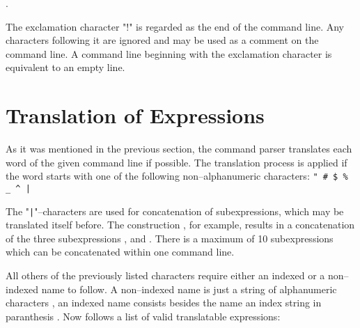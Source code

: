 .

\noindent
The exclamation character "!" is regarded as the end of the
command line.  Any characters following it are ignored and may be
used as a comment on the command line.  A command line beginning
with the exclamation character is equivalent to an empty line.



\section{Translation of Expressions}
\label{sec:Translation}

As it was mentioned in the previous section, the command parser
translates each word of the given command line if possible.
The translation process is applied if the word starts with one
of the following non--alphanumeric characters:
\verb+" # $ % _ ^ |+

The "\verb+|+"--characters are used for concatenation of
subexpressions, which may be translated itself before. The
construction , for example, results in a
concatenation of the three subexpressions ,
 and .  There is a maximum of 10
subexpressions which can be concatenated within one command
line.

All others of the previously listed characters require either
an indexed or a non--indexed name to follow.  A non--indexed
name is just a string of alphanumeric characters ,
an indexed name consists besides the name an index string
in paranthesis .  Now follows a list of
valid translatable expressions:

